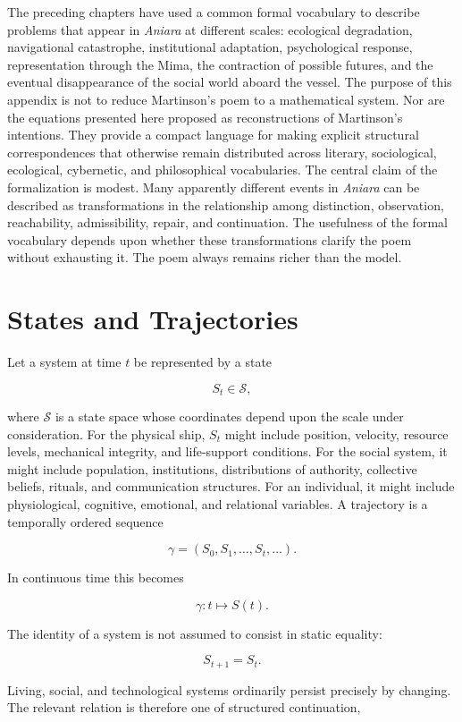 \documentclass[11pt,oneside]{book}
\theoremstyle{definition}
\theoremstyle{remark}
\begin{document}
The preceding chapters have used a common formal vocabulary to describe problems that appear in
\emph{Aniara} at different scales: ecological degradation, navigational catastrophe, institutional
adaptation, psychological response, representation through the Mima, the contraction of possible
futures, and the eventual disappearance of the social world aboard the vessel. The purpose of this
appendix is not to reduce Martinson's poem to a mathematical system. Nor are the equations presented
here proposed as reconstructions of Martinson's intentions. They provide a compact language for
making explicit structural correspondences that otherwise remain distributed across literary,
sociological, ecological, cybernetic, and philosophical vocabularies. The central claim of the
formalization is modest. Many apparently different events in \emph{Aniara} can be described as
transformations in the relationship among distinction, observation, reachability, admissibility,
repair, and continuation. The usefulness of the formal vocabulary depends upon whether these
transformations clarify the poem without exhausting it. The poem always remains richer than the
model.

\section{States and Trajectories}

Let a system at time \(t\) be represented by a state

\[
S_t\in\mathcal{S},
\]

where \(\mathcal{S}\) is a state space whose coordinates depend upon the scale under consideration.
For the physical ship, \(S_t\) might include position, velocity, resource levels, mechanical
integrity, and life-support conditions. For the social system, it might include population,
institutions, distributions of authority, collective beliefs, rituals, and communication structures.
For an individual, it might include physiological, cognitive, emotional, and relational variables. A
trajectory is a temporally ordered sequence

\[
\gamma = (S_0,S_1,\ldots,S_t,\ldots).
\]

In continuous time this becomes

\[
\gamma:t\mapsto S(t).
\]

The identity of a system is not assumed to consist in static equality:

\[
S_{t+1}=S_t.
\]

Living, social, and technological systems ordinarily persist precisely by changing. The relevant
relation is therefore one of structured continuation,
\end{document}
